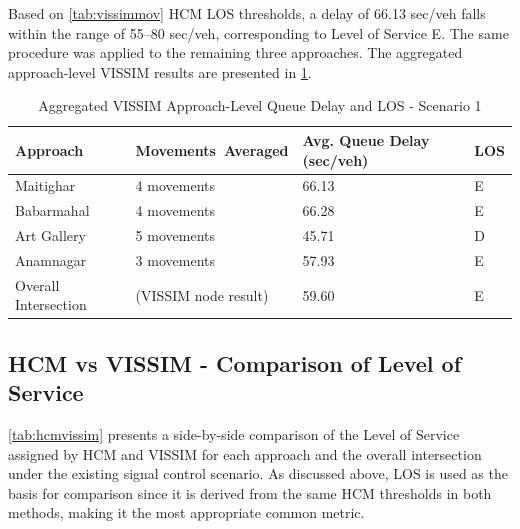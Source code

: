 
Based on \cref{tab:vissimmov} HCM LOS thresholds, a delay of 66.13 sec/veh 
falls within the range of 55–80 sec/veh, corresponding to 
Level of Service E. The same procedure was applied to the 
remaining three approaches. The aggregated approach-level 
VISSIM results are presented in \cref{tab:aggvissim}.


\begin{table}[h!]
   \centering
   \caption{Aggregated VISSIM Approach-Level Queue Delay and LOS - Scenario 1}
   \begin{tabular}{|l|l|p{3.2cm}|l|}
      \hline
      Approach &	Movements\ Averaged & Avg. Queue Delay (sec/veh)	& LOS \\
      \hline
      Maitighar &	4 movements	& 66.13 &	E \\
      \hline
      Babarmahal	& 4 movements &	66.28 &	E \\
      \hline
      Art Gallery	& 5 movements & 45.71 & D \\
      \hline
      Anamnagar &	3 movements	& 57.93 & E \\
      \hline
      Overall Intersection &	(VISSIM node result) &  59.60	& E \\
      \hline
      
   \end{tabular}
   \label{tab:aggvissim}

\end{table}


\subsection{HCM vs VISSIM - Comparison of Level of Service}

\cref{tab:hcmvissim} presents a side-by-side comparison of the Level of Service assigned by 
HCM and VISSIM for each approach and the overall intersection 
under the existing signal control scenario. As discussed 
above, LOS is used as the basis for comparison since it is 
derived from the same HCM thresholds in both methods, making 
it the most appropriate common metric.

